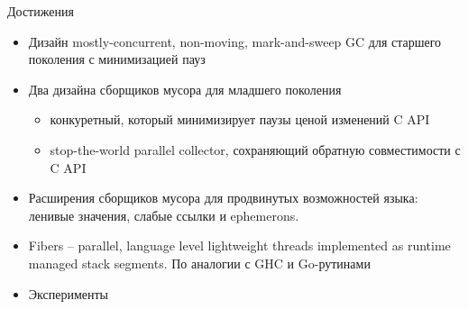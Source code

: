 \documentclass[aspectratio=169
  , xcolor={svgnames} 
  , hyperref={ colorlinks,citecolor=DeepPink4
             , linkcolor=DarkRed,urlcolor=DarkBlue}
  , russian
  ]{beamer}
\theoremstyle{exerciseStyle1}
\begin{document}
\begin{frame}[fragile]{Достижения}
\begin{itemize}
  \item Дизайн mostly-concurrent, non-moving, mark-and-sweep GC для старшего поколения с минимизацией пауз
  \item Два дизайна сборщиков мусора для младшего поколения 
  \begin{itemize}
  \item конкуретный, который минимизирует паузы ценой изменений  C API 
  \item  stop-the-world parallel collector, сохраняющий обратную совместимости с C API
  \end{itemize}
  
  \item Расширения сборщиков мусора для продвинутых возможностей языка: ленивые значения, слабые ссылки и  ephemerons. 
  
  
  \item Fibers -- parallel, language level lightweight threads implemented as runtime managed stack segments. По аналогии с GHC и Go-рутинами

  \item Эксперименты
\end{itemize}
\end{frame}
\end{document}
